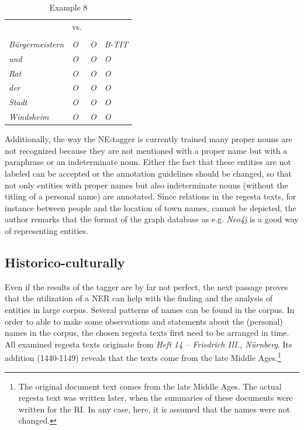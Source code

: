 \documentclass[11pt,a4paper]{article}
\begin{document}
\begin{table}
\begin{tabular}{l l l l}
		\\
		&vs.\\
		\\ \hline
		\textit{B{\"u}rgermeistern} & \textit{O} & \textit{O} & \textit{\textcolor{customGreen}{B-TIT}} \\ \hline
		\textit{und} & \textit{O} & \textit{O} & \textit{\textcolor{customRed}{O}} \\ \hline
		\textit{Rat} & \textit{O} & \textit{O} & \textit{\textcolor{customRed}{O}} \\ \hline
		\textit{der} & \textit{O} & \textit{O} & \textit{\textcolor{customRed}{O}} \\ \hline
		\textit{Stadt} & \textit{O} & \textit{O} & \textit{\textcolor{customRed}{O}} \\ \hline
		\textit{Windsheim} & \textit{\textcolor{customRed}{O}} & \textit{O} & \textit{\textcolor{customRed}{O}} \\ \hline
	\end{tabular}
	\caption{Example 8}
	\label{tab:example8}
\end{table}

Additionally, the way the NE-tagger is currently trained many proper nouns are not recognized because they are not mentioned with a proper name but with a paraphrase or an indeterminate noun. Either the fact that these entities are not labeled can be accepted or the annotation guidelines should be changed, so that not only entities with proper names but also indeterminate nouns (without the titling of a personal name) are annotated. Since relations in the regesta texts, for instance between people and the location of town names, cannot be depicted, the author remarks that the format of the graph database as e.g. \textit{Neo4j} is a good way of representing entities.

\subsection{Historico-culturally}
Even if the results of the tagger are by far not perfect, the next passage proves that the utilization of a NER can help with the finding and the analysis of entities in large corpus. Several patterns of names can be found in the corpus. In order to able to make some observations and statements about the (personal) names in the corpus, the chosen regesta texts first need to be arranged in time. All examined regesta texts originate from \textit{Heft 14 – Friedrich III., N{\"u}rnberg}. Its addition (1440-1149) reveals that the texts come from the late Middle Ages.\footnote{The original document text comes from the late Middle Ages. The actual regesta text was written later, when the summaries of these documents were written for the RI. In any case, here, it is assumed that the names were not changed.}
\end{document}
